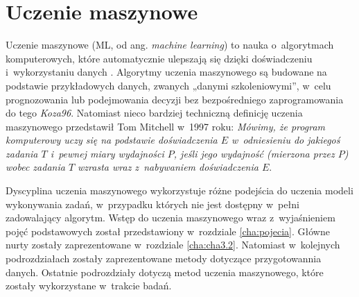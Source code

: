 %		
%
%
%
%

\chapter{Uczenie maszynowe}
\label{cha:ucz.masz}

Uczenie maszynowe (ML, od ang. \textit{machine learning}) to nauka o~algorytmach komputerowych, które automatycznie ulepszają się dzięki doświadczeniu i~wykorzystaniu danych \cite{Mitchell97}. Algorytmy uczenia maszynowego są budowane na podstawie przykładowych danych, zwanych „danymi szkoleniowymi”, w~celu prognozowania lub podejmowania decyzji bez bezpośredniego zaprogramowania do tego \textit{Koza96}. Natomiast nieco bardziej techniczną definicję uczenia maszynowego przedstawił Tom Mitchell w~1997 roku: \textit{Mówimy, że program komputerowy uczy się na podstawie doświadczenia $E$ w~odniesieniu do jakiegoś zadania $T$ i~pewnej miary wydajności $P$, jeśli jego wydajność (mierzona przez $P$) wobec zadania $T$ wzrasta wraz z~nabywaniem doświadczenia $E$}.

Dyscyplina uczenia maszynowego wykorzystuje różne podejścia do uczenia modeli wykonywania zadań, w~przypadku których nie jest dostępny w~pełni zadowalający algorytm. Wstęp do uczenia maszynowego wraz z~wyjaśnieniem pojęć podstawowych został przedstawiony w~rozdziale \ref{cha:pojecia}. Główne nurty zostały zaprezentowane w~rozdziale \ref{cha:cha3.2}. Natomiast w~kolejnych podrozdziałach zostały zaprezentowane metody dotyczące przygotowannia danych. Ostatnie podrozdziały dotyczą metod  uczenia maszynowego, które zostały wykorzystane w~trakcie badań.

